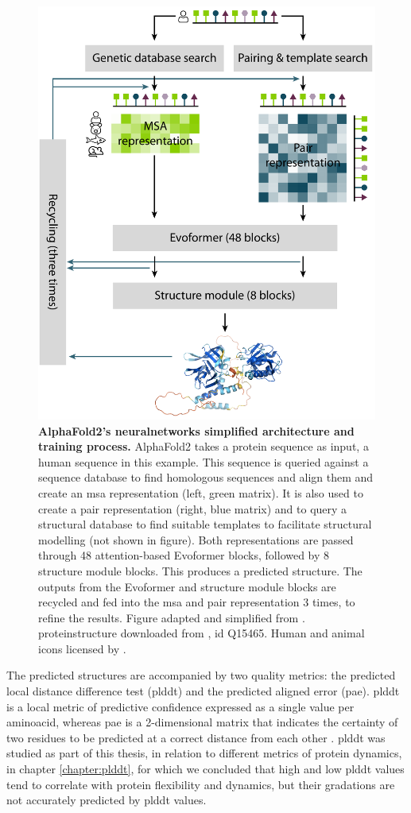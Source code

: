\begin{figure}[H]
    \centering
    \includegraphics[width=0.75\linewidth]{figures/af2_architecture_simple.pdf}
    \caption{\textbf{AlphaFold2's \gls{neuralnetworks} simplified architecture and training process.} AlphaFold2 takes a protein sequence as input, a human sequence in this example. This sequence is queried against a sequence database to find homologous sequences and align them and create an \gls{msa} representation (left, green matrix). It is also used to create a pair representation (right, blue matrix) and to query a structural database to find suitable templates to facilitate structural modelling (not shown in figure). Both representations are passed through 48 \gls{attention}-based Evoformer blocks, followed by 8 structure module blocks. This produces a predicted structure. The outputs from the Evoformer and structure module blocks are recycled and fed into the \gls{msa} and pair representation 3 times, to refine the results. Figure adapted and simplified from \cite{jumper_highly_2021}. \gls{proteinstructure} downloaded from , id Q15465. Human and animal icons licensed by .}
    \label{fig:chapter1:af2_structure}
\end{figure}

The predicted structures are accompanied by two quality metrics: the predicted local distance difference test (\gls{plddt}) and the predicted aligned error (\gls{pae}). \gls{plddt} is a local metric of predictive confidence expressed as a single value per \gls{aminoacid}, whereas \gls{pae} is a 2-dimensional matrix that indicates the certainty of two residues to be predicted at a correct distance from each other \cite{jumper_highly_2021}. \gls{plddt} was studied as part of this thesis, in relation to different metrics of protein \gls{dynamics}, in chapter \ref{chapter:plddt}, for which we concluded that high and low \gls{plddt} values tend to correlate with protein \gls{flexibility} and \gls{dynamics}, but their gradations are not accurately predicted by \gls{plddt} values. 

